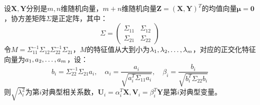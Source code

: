 \begin{theorem}
	设$\mathbf{X},\mathbf{Y}$分别是$m,n$维随机向量，$m+n$维随机向量$\mathbf{Z}=(\mathbf{X},\mathbf{Y})^T$的均值向量$\boldsymbol{\mu}=\mathbf{0}$，协方差矩阵$\Sigma$是正定阵，其中：
	\begin{equation*}
		\Sigma=
		\begin{pmatrix}
			\Sigma_{11} & \Sigma_{12} \\
			\Sigma_{21} & \Sigma_{22}
		\end{pmatrix}
	\end{equation*}
	令$M=\Sigma_{11}^{-1}\Sigma_{12}\Sigma_{22}^{-1}\Sigma_{21}$，$M$的特征值从大到小为$\lambda_1, \lambda_2, \dots, \lambda_{m}$，对应的正交化特征向量为$a_1, a_2, \dots, a_{m}$，设：
	\begin{equation*}
		b_i=\Sigma_{22}^{-1}\Sigma_{21}a_i,\quad\alpha_i=\frac{a_i}{\sqrt{a_i^T\Sigma_{11}a_i}},\quad\beta_i=\frac{b_i}{\sqrt{b_i^T\Sigma_{22}b_i}}
	\end{equation*}
	则$\sqrt{\lambda_i^2}$为第$i$对典型相关系数，$\mathbf{U}_i=\alpha_i^T\mathbf{X},\mathbf{V}_i=\beta_i^T\mathbf{Y}$是第$i$对典型变量。
\end{theorem}
